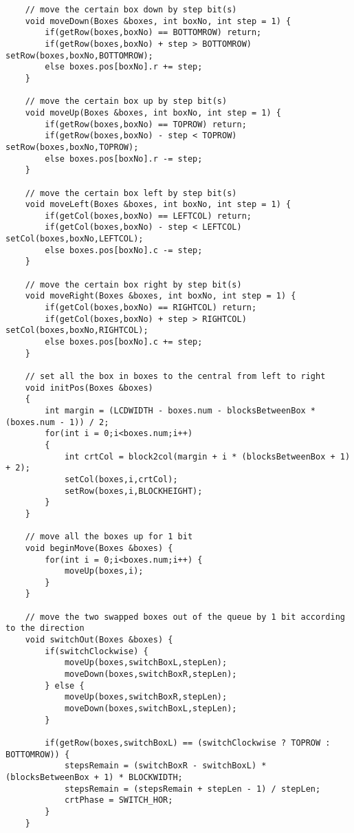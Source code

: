\begin{verbatim}
    // move the certain box down by step bit(s)
    void moveDown(Boxes &boxes, int boxNo, int step = 1) {
        if(getRow(boxes,boxNo) == BOTTOMROW) return;
        if(getRow(boxes,boxNo) + step > BOTTOMROW) setRow(boxes,boxNo,BOTTOMROW);
        else boxes.pos[boxNo].r += step;
    }

    // move the certain box up by step bit(s)
    void moveUp(Boxes &boxes, int boxNo, int step = 1) {
        if(getRow(boxes,boxNo) == TOPROW) return;
        if(getRow(boxes,boxNo) - step < TOPROW) setRow(boxes,boxNo,TOPROW);
        else boxes.pos[boxNo].r -= step;
    }

    // move the certain box left by step bit(s)
    void moveLeft(Boxes &boxes, int boxNo, int step = 1) {
        if(getCol(boxes,boxNo) == LEFTCOL) return;
        if(getCol(boxes,boxNo) - step < LEFTCOL) setCol(boxes,boxNo,LEFTCOL);
        else boxes.pos[boxNo].c -= step;
    }

    // move the certain box right by step bit(s)
    void moveRight(Boxes &boxes, int boxNo, int step = 1) {
        if(getCol(boxes,boxNo) == RIGHTCOL) return;
        if(getCol(boxes,boxNo) + step > RIGHTCOL) setCol(boxes,boxNo,RIGHTCOL);
        else boxes.pos[boxNo].c += step;
    }

    // set all the box in boxes to the central from left to right
    void initPos(Boxes &boxes)
    {
        int margin = (LCDWIDTH - boxes.num - blocksBetweenBox * (boxes.num - 1)) / 2;
        for(int i = 0;i<boxes.num;i++)
        {   
            int crtCol = block2col(margin + i * (blocksBetweenBox + 1) + 2);
            setCol(boxes,i,crtCol);
            setRow(boxes,i,BLOCKHEIGHT);
        }
    }

    // move all the boxes up for 1 bit
    void beginMove(Boxes &boxes) {
        for(int i = 0;i<boxes.num;i++) {
            moveUp(boxes,i);
        }
    }

    // move the two swapped boxes out of the queue by 1 bit according to the direction
    void switchOut(Boxes &boxes) {
        if(switchClockwise) {
            moveUp(boxes,switchBoxL,stepLen);
            moveDown(boxes,switchBoxR,stepLen);
        } else {
            moveUp(boxes,switchBoxR,stepLen);
            moveDown(boxes,switchBoxL,stepLen);
        }

        if(getRow(boxes,switchBoxL) == (switchClockwise ? TOPROW : BOTTOMROW)) {
            stepsRemain = (switchBoxR - switchBoxL) * (blocksBetweenBox + 1) * BLOCKWIDTH;
            stepsRemain = (stepsRemain + stepLen - 1) / stepLen;
            crtPhase = SWITCH_HOR;
        }
    }


\end{verbatim}
